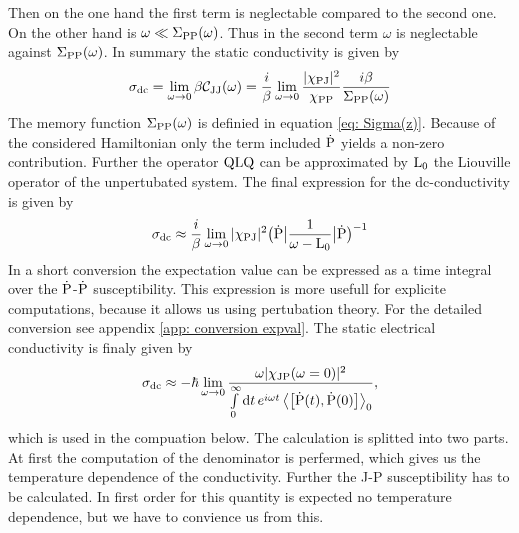 Then on the one hand the first term is neglectable compared to the second one. 
On the other hand is $\omega \ll \Sigma_{\mathrm{PP}}(\omega)$.
Thus in the second term $\omega$ is neglectable against $\Sigma_{\mathrm{PP}}(\omega)$.
In summary the static conductivity is given by
%
\begin{align}
	\sigma_{\mathrm{dc}} = \lim\limits_{\omega \to 0} \beta \mathcal{C}_{\mathrm{JJ}}(\omega) = \frac{i}{\beta} \lim\limits_{\omega \to 0} \frac{\vert\chi_{\mathrm{PJ}}\vert^{2}}{\chi_{\mathrm{PP}}} \frac{i \beta}{\Sigma_{\mathrm{PP}}(\omega)}
\end{align}
%
The memory function $\Sigma_{\mathrm{PP}}(\omega)$ is definied in equation \eqref{eq: Sigma(z)}.
Because of the considered Hamiltonian only the term included $\dot{\mathrm{P}}$ yields a non-zero contribution.
Further the operator $\mathrm{QLQ}$ can be approximated by $\mathrm{L}_{0}$ the Liouville operator of the unpertubated system. 
The final expression for the dc-conductivity is given by
%
\begin{align}
	\sigma_{\mathrm{dc}} \approx \frac{i}{\beta} \lim\limits_{\omega \to 0} \vert\chi_{\mathrm{PJ}}\vert^{2} \big({\dot{\mathrm{P}}}\big| \frac{1}{\omega - \mathrm{L_{0}}} \big|{\dot{\mathrm{P}}}\big)^{-1}
\end{align}
%
In a short conversion the expectation value can be expressed as a time integral over the $\dot{\mathrm{P}}$-$\dot{\mathrm{P}}$ susceptibility.
This expression is more usefull for explicite computations, because it allows us using pertubation theory.
For the detailed conversion see appendix \ref{app: conversion expval}.
The static electrical conductivity is finaly given by
%
\begin{align}
	\sigma_{\mt{dc}} \approx -\hbar \lim\limits_{\omega \to 0} \frac{\omega \vert \chi_{\mt{JP}}(\omega = 0) \vert^{2}}{\int\limits_{0}^{\infty} \dd{t} e^{i\omega t} \expval{\comm{\dot{\mt{P}}(t)}{\dot{\mt{P}}(0)}}_{0}},
	\label{eq: formula static conductivity}
\end{align}
%
which is used in the compuation below.
The calculation is splitted into two parts.
At first the computation of the denominator is perfermed, which gives us the temperature dependence of the conductivity.
Further the J-P susceptibility has to be calculated.
In first order for this quantity is expected no temperature dependence, but we have to convience us from this.
%
%
